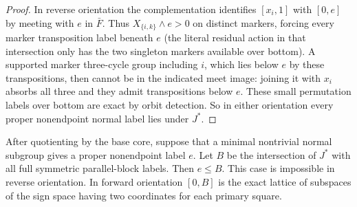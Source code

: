 \begin{proof}
In reverse orientation the complementation identifies \([x_i,1]\) with \([0,e]\) by meeting with
\(e\) in \(\bar F\). Thus \(X_{\{i,k\}}\wedge e>0\) on distinct markers, forcing every marker
transposition label beneath \(e\) (the literal residual action in that intersection only has the
two singleton markers available over bottom). A supported marker three-cycle group including
\(i\), which lies below \(e\) by these transpositions, then cannot be in the indicated meet image:
joining it with \(x_i\) absorbs all three and they admit transpositions below \(e\). These small
permutation labels over bottom are exact by orbit detection. So in either orientation every proper
nonendpoint normal label lies under \(J^*\).
\end{proof}

\begin{lemma}\label{t:weighted-normal-parallel}
After quotienting by the base core, suppose that a minimal nontrivial normal
subgroup gives a proper nonendpoint label \(e\).  Let \(B\) be the intersection
of \(J^*\) with all full symmetric parallel-block labels.  Then \(e\le B\).
This case is impossible in reverse orientation.  In forward orientation
\([0,B]\) is the exact lattice of subspaces of the sign space having two
coordinates for each primary square.
\end{lemma}

